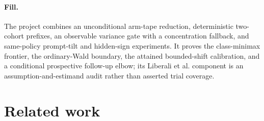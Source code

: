 \documentclass{article}
\begin{document}
\paragraph{Fill.} The project combines an unconditional arm-tape reduction, deterministic two-cohort prefixes, an observable variance gate with a concentration fallback, and same-policy prompt-tilt and hidden-sign experiments. It proves the class-minimax frontier, the ordinary-Wald boundary, the attained bounded-shift calibration, and a conditional prospective follow-up elbow; its Liberali et al. component is an assumption-and-estimand audit rather than asserted trial coverage.

\section{Related work}
\end{document}
